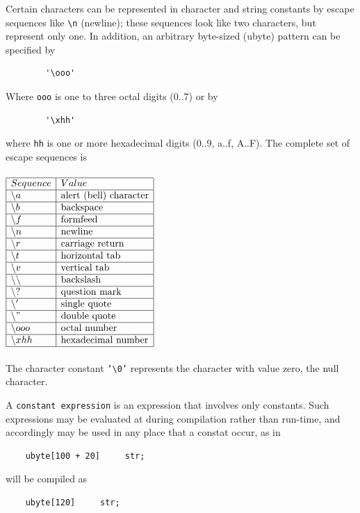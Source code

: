 \documentclass{scrartcl}
\begin{document}
            Certain characters can be represented in character and string constants
            by escape sequences like \texttt{\textbackslash n} (newline); these sequences look
            like two characters, but represent only one. In addition, an arbitrary
            byte-sized (ubyte) pattern can be specified by
            \begin{lstlisting}
        '\ooo'
            \end{lstlisting}
            Where \texttt{ooo} is one to three octal digits (0..7) or by
            \begin{lstlisting}
        '\xhh'
            \end{lstlisting}
            where \texttt{hh} is one or more hexadecimal digits (0..9, a..f, A..F).
            The complete set of escape sequences is
\\\\
$\begin{array}{|l|l|}
\hline
Sequence & Value\\
\hline
\backslash a & \text{alert (bell) character} \\
\hline
\backslash b & \text{backspace} \\
\hline
\backslash f & \text{formfeed} \\
\hline
\backslash n & \text{newline} \\
\hline
\backslash r & \text{carriage return} \\
\hline
\backslash t & \text{horizontal tab} \\
\hline
\backslash v & \text{vertical tab} \\
\hline
\backslash \backslash & \text{backslash} \\
\hline
\backslash ? & \text{question mark} \\
\hline
\backslash ' & \text{single quote} \\
\hline
\backslash " & \text{double quote} \\
\hline
\backslash ooo & \text{octal number} \\
\hline
\backslash xhh & \text{hexadecimal number} \\
\hline
\end{array}$
\\\\
        The character constant \texttt{'\textbackslash 0'} represents the character
        with value zero, the null character.

        A \texttt{constant expression} is an expression that involves only constants.
        Such expressions may be evaluated at during compilation rather than run-time,
        and accordingly may be used in any place that a constat occur, as in
        \begin{lstlisting}
    ubyte[100 + 20]     str;
        \end{lstlisting}
        will be compiled as
        \begin{lstlisting}
    ubyte[120]     str;
        \end{lstlisting}
\end{document}
